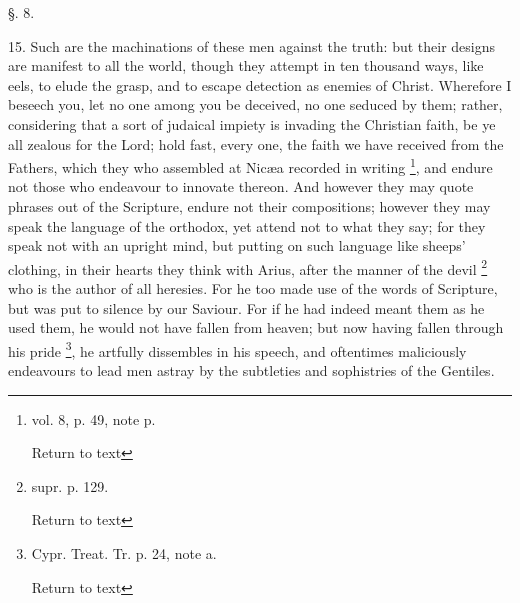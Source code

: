§. 8.

15. Such are the machinations of these men
against the truth: but their designs are manifest to all the world,
though they attempt in ten thousand ways, like eels, to elude the
grasp, and to escape detection as enemies of Christ. Wherefore I
beseech you, let no one among you be deceived, no one seduced by them;
rather, considering that a sort of judaical impiety is invading the
Christian faith, be ye all zealous for the Lord; hold fast, every one,
the faith we have received from the Fathers, which they who assembled
at Nicæa recorded in writing \footnote{vol. 8, p. 49, note p.

Return to text}, and endure not those who endeavour to innovate thereon. And
however they may quote phrases out of the Scripture, endure not their
compositions; however they may speak the language of the orthodox, yet
attend not to what they say; for they speak not with an upright mind,
but putting on such language like sheeps' clothing, in their hearts
they think with Arius, after the manner of the devil \footnote{supr. p. 129.

Return to text} who is the author of all heresies. For he too made use of the
words of Scripture, but was put to silence by our Saviour. For if he
had indeed meant them as he used them, he would not have fallen from
heaven; but now having fallen through his pride \footnote{Cypr. Treat. Tr. p. 24, note a.

Return to text}, he artfully dissembles in his speech, and oftentimes
maliciously endeavours to lead men astray by the subtleties and
sophistries of the Gentiles.

